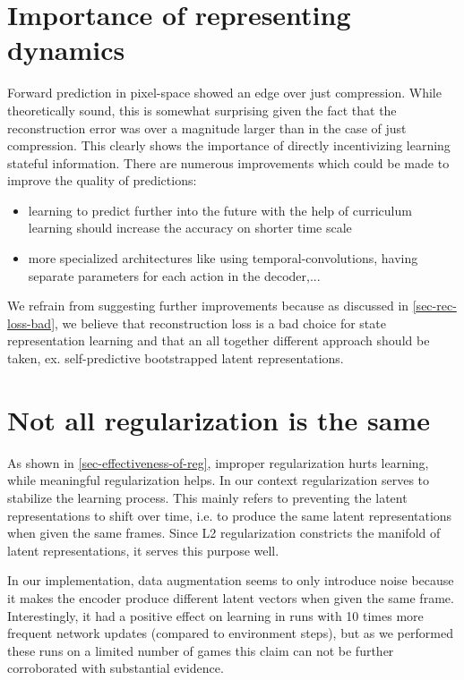 \section{Importance of representing dynamics}
Forward prediction in pixel-space showed an edge over just compression.
While theoretically sound, this is somewhat surprising given the fact that 
the reconstruction error was over a magnitude larger than in the case of just compression.
This clearly shows the importance of directly incentivizing learning stateful information.
There are numerous improvements which could be made to improve the quality of predictions:
\begin{itemize}
		\item learning to predict further into the future with the help of curriculum learning should
increase the accuracy on shorter time scale
\item more specialized architectures like using temporal-convolutions, having separate parameters 
		for each action in the decoder,...
\end{itemize}
We refrain from suggesting further improvements because as discussed in \ref{sec-rec-loss-bad},
we believe that reconstruction loss is a bad choice for state representation learning 
and that an all together different approach should be taken, ex. self-predictive bootstrapped latent
representations.


\section{Not all regularization is the same}
As shown in \ref{sec-effectiveness-of-reg}, improper regularization hurts learning, while
meaningful regularization helps.
In our context regularization serves to stabilize the learning process.
This mainly refers to preventing the latent representations to shift over time,
i.e. to produce the same latent representations when given the same frames.
Since L2 regularization constricts the manifold of latent representations,
it serves this purpose well.

In our implementation, data augmentation seems to only introduce noise because it makes
the encoder produce
different latent vectors when given the same frame.
Interestingly, it had a positive effect on learning in runs with 10 times more frequent
network updates (compared to environment steps), but as we performed these runs
on a limited number of games this claim can not be further corroborated with substantial evidence.

